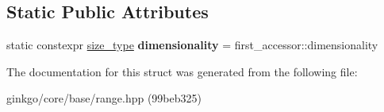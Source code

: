 \subsection*{Static Public Attributes}
\begin{DoxyCompactItemize}
\item 
\mbox{\label{structgko_1_1accessor_1_1mmul__operation_ae8057c37357eae7ea962f11aab54a38e}} 
static constexpr \hyperlink{namespacegko_a6e5c95df0ae4e47aab2f604a22d98ee7}{size\+\_\+type} {\bfseries dimensionality} = first\+\_\+accessor\+::dimensionality
\end{DoxyCompactItemize}


The documentation for this struct was generated from the following file\+:\begin{DoxyCompactItemize}
\item 
ginkgo/core/base/range.\+hpp (99beb325)\end{DoxyCompactItemize}
